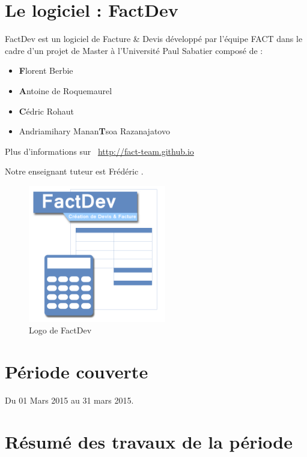 \documentclass[12pt,a4paper,openany]{article}
\begin{document}
	\thispagestyle{empty} %
	\titleBC 
	\newpage
	\setcounter{tocdepth}{1}
	\setcounter{secnumdepth}{3}
	
	\tableofcontents
	\newpage
	\section{Le logiciel : FactDev}
	FactDev est un logiciel de Facture \& Devis développé par l'équipe FACT dans le cadre d'un projet de Master à l'Université Paul Sabatier composé de : 
	\begin{itemize}
		\item \textbf{F}lorent Berbie
		\item \textbf{A}ntoine de Roquemaurel
		\item \textbf{C}édric Rohaut
		\item Andriamihary Manan\textbf{T}soa Razanajatovo
	\end{itemize}

	Plus d’informations sur \Mundus~\url{http://fact-team.github.io}

	Notre enseignant tuteur est Frédéric .

	\begin{figure}[H]
		\centering
		\includegraphics[width=6cm]{../FACTDev.png}
		\caption{Logo de FactDev}
	\end{figure}

 	\section{Période couverte}
	Du 01 Mars 2015 au 31 mars 2015.

	\section{Résumé des travaux de la période}
\end{document}
